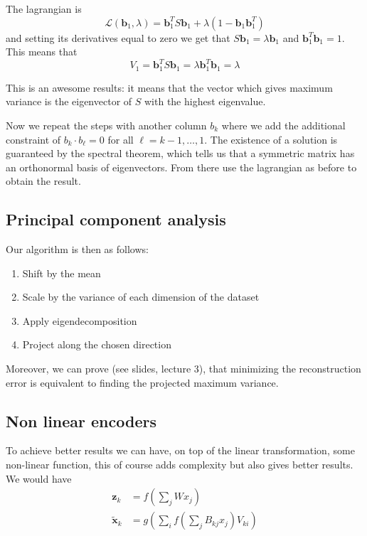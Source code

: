 \documentclass[12pt]{extarticle}
\renewcommand{\vec}[1]{\bm{#1}}
\begin{document}
The lagrangian is
\begin{equation}
	\mathcal L(\vec b_1, \lambda) = \vec b_1^T S \vec b_1 + \lambda(1-\vec b_1 \vec b_1^T)
\end{equation}
and setting its derivatives equal to zero we get that $S \vec b_1 = \lambda \vec b_1$
and $\vec b_1^T \vec b_1 = 1$.
This means that
\begin{equation}
	V_1 = \vec b_1^T S \vec b_1 = \lambda \vec b_1^T \vec b_1 = \lambda
\end{equation}

This is an awesome results: it means that the vector which gives maximum variance is the eigenvector
of $S$ with the highest eigenvalue.

Now we repeat the steps with another column $b_k$ where we add the additional constraint
of $b_k \cdot b_\ell = 0$ for all $\ell = k-1, \dots, 1$.
The existence of a solution is guaranteed by the spectral theorem, which tells us that a symmetric
matrix has an orthonormal basis of eigenvectors.
From there use the lagrangian as before to obtain the result.

\subsection{Principal component analysis}

Our algorithm is then as follows:
\begin{enumerate}[label=\roman*.]
	\item Shift by the mean
	\item Scale by the variance of each dimension of the dataset
	\item Apply eigendecomposition
	\item Project along the chosen direction
\end{enumerate}

Moreover, we can prove (see slides, lecture 3), that minimizing the reconstruction error
is equivalent to finding the projected maximum variance.

\subsection{Non linear encoders}
To achieve better results we can have, on top of the linear transformation, some non-linear function,
this of course adds complexity but also gives better results.
We would have
\begin{align}
	\vec z_k         & = f\left(\sum_j W x_j\right)                                  \\
	\tilde{\vec x}_k & = g\left(\sum_i f\left(\sum_j B_{kj} x_j\right) V_{ki}\right)
\end{align}
\end{document}
